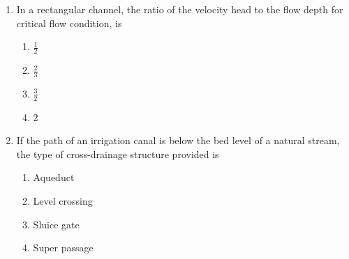 \documentclass[12pt]{article}
\begin{document}
\begin{enumerate}[label=Q.\arabic*]
	\item In a rectangular channel, the ratio of the velocity head to the flow depth for critical flow condition, is  
		\begin{multicols}{4}
			\begin{enumerate}[label=(\Alph*)]
				\item $\frac{1}{2}$  
				\item $\frac{2}{3}$  
				\item $\frac{3}{2}$  
				\item 2  
			\end{enumerate}
		\end{multicols}

	\item If the path of an irrigation canal is below the bed level of a natural stream, the type of cross-drainage structure provided is  
		\begin{multicols}{2}
			\begin{enumerate}[label=(\Alph*)]
				\item Aqueduct  
				\item Level crossing  
				\item Sluice gate  
				\item Super passage  
			\end{enumerate}
		\end{multicols}


\end{enumerate}
\end{document}

